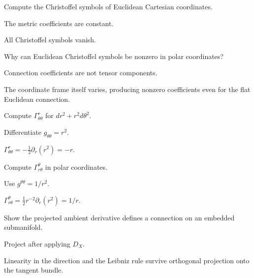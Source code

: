 \begin{exercise}\label{exr:vii22-11}
Compute the Christoffel symbols of Euclidean Cartesian coordinates.
\end{exercise}
\begin{hint}
The metric coefficients are constant.
\end{hint}
\begin{solution}
All Christoffel symbols vanish.
\end{solution}


\begin{exercise}\label{exr:vii22-12}
Why can Euclidean Christoffel symbols be nonzero in polar coordinates?
\end{exercise}
\begin{hint}
Connection coefficients are not tensor components.
\end{hint}
\begin{solution}
The coordinate frame itself varies, producing nonzero coefficients even for the flat Euclidean connection.
\end{solution}


\begin{exercise}\label{exr:vii22-13}
Compute \(\Gamma^r_{\theta\theta}\) for \(dr^2+r^2d\theta^2\).
\end{exercise}
\begin{hint}
Differentiate \(g_{\theta\theta}=r^2\).
\end{hint}
\begin{solution}
\(\Gamma^r_{\theta\theta}=-\frac12\partial_r(r^2)=-r\).
\end{solution}


\begin{exercise}\label{exr:vii22-14}
Compute \(\Gamma^\theta_{r\theta}\) in polar coordinates.
\end{exercise}
\begin{hint}
Use \(g^{\theta\theta}=1/r^2\).
\end{hint}
\begin{solution}
\(\Gamma^\theta_{r\theta}=\frac12r^{-2}\partial_r(r^2)=1/r\).
\end{solution}


\begin{exercise}\label{exr:vii22-15}
Show the projected ambient derivative defines a connection on an embedded submanifold.
\end{exercise}
\begin{hint}
Project after applying \(D_X\).
\end{hint}
\begin{solution}
Linearity in the direction and the Leibniz rule survive orthogonal projection onto the tangent bundle.
\end{solution}


